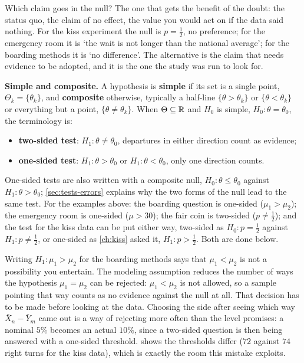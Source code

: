 Which claim goes in the null?
The one that gets the benefit of the doubt: the status quo, the claim of no effect, the value you would act on if the data said nothing.
For the kiss experiment the null is $p = \frac12$, no preference; for the emergency room it is `the wait is not longer than the national average'; for the boarding methods it is `no difference'.
The alternative is the claim that needs evidence to be adopted, and it is the one the study was run to look for.

\textbf{Simple and composite.}
A hypothesis is \textbf{simple} if its set is a single point, $\Theta_k = \{\theta_k\}$, and \textbf{composite} otherwise, typically a half-line $\{\theta > \theta_k\}$ or $\{\theta < \theta_k\}$ or everything but a point, $\{\theta \neq \theta_k\}$.
When $\Theta \subseteq \mathbb{R}$ and $H_0$ is simple, $H_0: \theta = \theta_0$, the terminology is:
\begin{itemize}[nosep]
\item \textbf{two-sided test}: $H_1: \theta \neq \theta_0$, departures in either direction count as evidence;
\item \textbf{one-sided test}: $H_1: \theta > \theta_0$ or $H_1: \theta < \theta_0$, only one direction counts.
\end{itemize}
One-sided tests are also written with a composite null, $H_0: \theta \leq \theta_0$ against $H_1: \theta > \theta_0$; \cref{sec:tests-errors} explains why the two forms of the null lead to the same test.
For the examples above: the boarding question is one-sided ($\mu_1 > \mu_2$); the emergency room is one-sided ($\mu > 30$); the fair coin is two-sided ($p \neq \frac12$); and the test for the kiss data can be put either way, two-sided as $H_0: p = \frac12$ against $H_1: p \neq \frac12$, or one-sided as \cref{ch:kiss} asked it, $H_1: p > \frac12$.
Both are done below.

\begin{pitfall}
Writing $H_1: \mu_1 > \mu_2$ for the boarding methods says that $\mu_1 < \mu_2$ is not a possibility you entertain.
The modeling assumption reduces the number of ways the hypothesis $\mu_1 = \mu_2$ can be rejected: $\mu_1 < \mu_2$ is not allowed, so a sample pointing that way counts as no evidence against the null at all.
That decision has to be made before looking at the data.
Choosing the side after seeing which way $\bar{X}_n - \bar{Y}_m$ came out is a way of rejecting more often than the level promises: a nominal $5\%$ becomes an actual $10\%$, since a two-sided question is then being answered with a one-sided threshold.
 shows the thresholds differ ($72$ against $74$ right turns for the kiss data), which is exactly the room this mistake exploits.
\end{pitfall}

